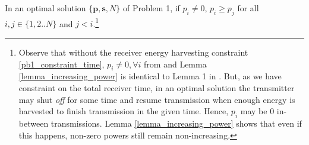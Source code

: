 
\begin{lemma}
In an optimal solution $\{\bm{p},\bm{s},N\}$ of Problem 1, if $p_i\neq 0$, $p_i\ge p_j$ for all $i,j\in \{1,2..N\}$ and $j<i$.\footnote{\label{note1}Observe that without the receiver energy harvesting constraint \eqref{pb1_constraint_time}, $p_i\neq 0,\forall i$ from \cite{Yang} and Lemma \ref{lemma_increasing_power} is identical to  Lemma 1 in \cite{Yang}. But, as we have constraint on the total receiver time, in an optimal solution the transmitter may shut \textit{off} for some time and resume transmission when enough energy is harvested to finish transmission in the given time. Hence, $p_i$ may be $0$ in-between transmissions. Lemma \ref{lemma_increasing_power} shows that even if this happens, non-zero powers still remain non-increasing.
}
\label{lemma_increasing_power}
\end{lemma}
 
